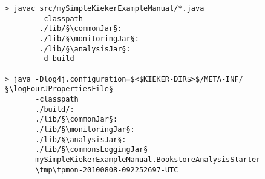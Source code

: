 \begin{lstlisting}[caption=Compile and run under Linux] 			
> javac src/mySimpleKiekerExampleManual/*.java
        -classpath	
        ./lib/§\commonJar§:
        ./lib/§\monitoringJar§:
        ./lib/§\analysisJar§:
        -d build

> java -Dlog4j.configuration=$<$KIEKER-DIR$>$/META-INF/§\logFourJPropertiesFile§
       -classpath
       ./build/:
       ./lib/§\commonJar§:
       ./lib/§\monitoringJar§:
       ./lib/§\analysisJar§:
       ./lib/§\commonsLoggingJar§
       mySimpleKiekerExampleManual.BookstoreAnalysisStarter 
       \tmp\tpmon-20100808-092252697-UTC
\end{lstlisting}	
